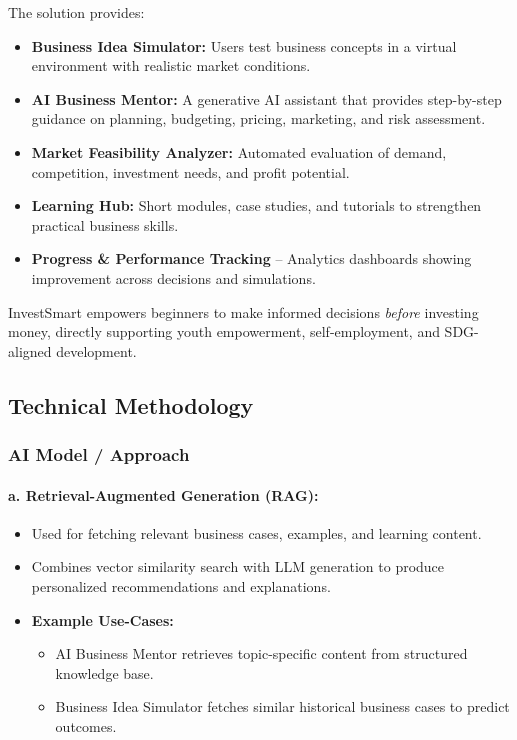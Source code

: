 \documentclass[12pt,letterpaper]{article}
\begin{document}
The solution provides:

\begin{itemize}
    \item \textbf{Business Idea Simulator:} Users test business concepts in a virtual environment with realistic market conditions.
    
    \item \textbf{AI Business Mentor:} A generative AI assistant that provides step-by-step guidance on planning, budgeting, pricing, marketing, and risk assessment.
    
    \item \textbf{Market Feasibility Analyzer:} Automated evaluation of demand, competition, investment needs, and profit potential.
    
    \item \textbf{Learning Hub:} Short modules, case studies, and tutorials to strengthen practical business skills.
    
    \item \textbf{Progress \& Performance Tracking} – Analytics dashboards showing improvement across decisions and simulations.
\end{itemize}

InvestSmart empowers beginners to make informed decisions \textit{before} investing money, directly supporting youth empowerment, self-employment, and SDG-aligned development.

\subsection{Technical Methodology}

\subsubsection{ AI Model / Approach}

\paragraph{a. Retrieval-Augmented Generation (RAG):}
\begin{itemize}
    \item Used for fetching relevant business cases, examples, and learning content.
    \item Combines vector similarity search with LLM generation to produce personalized recommendations and explanations.
    \item \textbf{Example Use-Cases:}
          \begin{itemize}
              \item AI Business Mentor retrieves topic-specific content from structured knowledge base.
              \item Business Idea Simulator fetches similar historical business cases to predict outcomes.
          \end{itemize}
\end{itemize}
\end{document}
